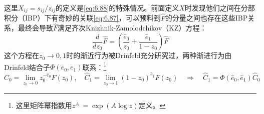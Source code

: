 这里$X_{ij}=s_{ij}/z_{ij}$的定义是\ref{eq:6.88}的特殊情况。前面定义$X$时发现他们之间在分部积分（IBP）下有奇妙的关联\ref{eq:6.87}，可以预料到$\hat F$的分量之间也存在这些IBP关系，最终会导致$\hat F$满足齐次Knizhnik-Zamolodchikov（KZ）方程：
\begin{equation}
	\label{eq:KZ}
	\frac{d}{dz_0}\hat{F}=\left(\frac{\hat{e}_0}{z_0}+\frac{\hat{e}_1}{1-z_0}\right)\hat{F}
\end{equation}
这个方程在$z_0\to 0,1$时的渐近行为被Drinfeld充分研究过\cite{drinfeld1990quasi,drinfeld1991quasi}，两种渐进行为由Drinfeld结合子$\Phi(e_0,e_1)$联系：\footnote{这里矩阵幂指数用$z^A\:= \exp(A\log z)$定义。}
\begin{equation}
	\label{eq:6.134}
	\hat{C}_{0}=\lim_{z_{0}\to0}z_{0}^{-\hat{e}_{0}}F(z_{0}),\quad \hat{C}_{1}=\lim_{z_{0}\to1}(1-z_{0})^{\hat{e}_{1}}F(z_{0})\quad\Rightarrow\quad \hat{C}_{1}=\Phi(\hat{e}_{0},\hat{e}_{1})\hat{C}_{0}
\end{equation}

